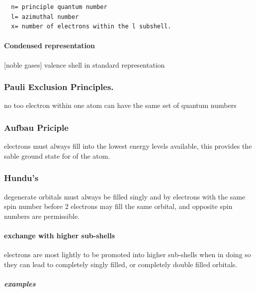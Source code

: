 \documentclass[]{article}
\let\oldparagraph\paragraph
\renewcommand{\paragraph}[1]{\oldparagraph{#1}\mbox{}}
\let\oldsubparagraph\subparagraph
\renewcommand{\subparagraph}[1]{\oldsubparagraph{#1}\mbox{}}
\begin{document}
\begin{verbatim}
  n= principle quantum number
  l= azimuthal number
  x= number of electrons within the l subshell.      
\end{verbatim}

\hypertarget{condensed-representation}{%
\paragraph{Condensed representation}\label{condensed-representation}}

{[}noble gases{]} valence shell in standard representation

\hypertarget{pauli-exclusion-principles.}{%
\subsubsection{Pauli Exclusion
Principles.}\label{pauli-exclusion-principles.}}

no too electron within one atom can have the same set of quantum numbers

\hypertarget{aufbau-priciple}{%
\subsubsection{Aufbau Priciple}\label{aufbau-priciple}}

electrons must always fill into the lowest energy levels available, this
provides the sable ground state for of the atom.

\hypertarget{hundus}{%
\subsubsection{Hundu's}\label{hundus}}

degenerate orbitals must always be filled singly and by electrons with
the same spin number before 2 electrons may fill the same orbital, and
opposite spin numbers are permissible.

\hypertarget{exchange-with-higher-sub-shells}{%
\paragraph{exchange with higher
sub-shells}\label{exchange-with-higher-sub-shells}}

electrons are most lightly to be promoted into higher sub-shells when in
doing so they can lead to completely singly filled, or completely double
filled orbitals.

\hypertarget{examples}{%
\subparagraph{examples}\label{examples}}
\end{document}
